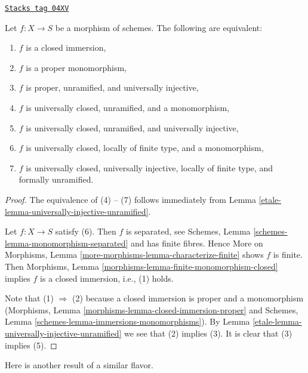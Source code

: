\begin{lemma}
\label{etale-lemma-characterize-closed-immersion}
\href{https://stacks.math.columbia.edu/tag/04XV}{\texttt{Stacks tag 04XV}}

Let $f : X \to S$ be a morphism of schemes.
The following are equivalent:
\begin{enumerate}
\item $f$ is a closed immersion,
\item $f$ is a proper monomorphism,
\item $f$ is proper, unramified, and universally injective,
\item $f$ is universally closed, unramified, and a monomorphism,
\item $f$ is universally closed, unramified, and universally injective,
\item $f$ is universally closed, locally of finite type, and a monomorphism,
\item $f$ is universally closed, universally injective, locally of
finite type, and formally unramified.
\end{enumerate}
\end{lemma}

\begin{proof}

The equivalence of (4) -- (7) follows immediately from
Lemma \ref{etale-lemma-universally-injective-unramified}.

\medskip\noindent
Let $f : X \to S$ satisfy (6). Then $f$ is separated, see
Schemes, Lemma \ref{schemes-lemma-monomorphism-separated}
and has finite fibres. Hence
More on Morphisms, Lemma \ref{more-morphisms-lemma-characterize-finite}
shows $f$ is finite. Then
Morphisms, Lemma \ref{morphisms-lemma-finite-monomorphism-closed}
implies $f$ is a closed immersion, i.e., (1) holds.

\medskip\noindent
Note that (1) $\Rightarrow$ (2) because a closed immersion is
proper and a monomorphism
(Morphisms, Lemma \ref{morphisms-lemma-closed-immersion-proper}
and
Schemes, Lemma \ref{schemes-lemma-immersions-monomorphisms}).
By
Lemma \ref{etale-lemma-universally-injective-unramified}
we see that (2) implies (3). It is clear that (3) implies (5).
\end{proof}

Here is another result of a similar flavor.

